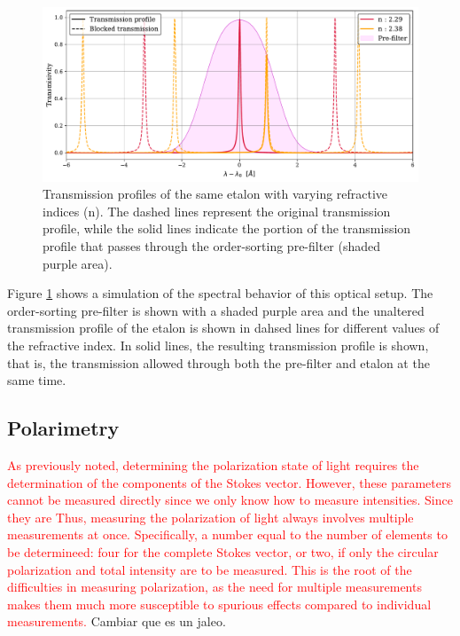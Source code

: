 \begin{figure}
  \centering
  \includegraphics[width = \textwidth]{figures/Introduction_to_spectropolarimeters/Etalon_and_prefilter_example.pdf}
  \caption{Transmission profiles of the same etalon with varying refractive indices (n). The dashed lines represent the original transmission profile, while the solid lines indicate the portion of the transmission profile that passes through the order-sorting pre-filter (shaded purple area).} 
  \label{fig_ch2: etalon_example}
\end{figure}

Figure \ref{fig_ch2: etalon_example} shows a simulation of the spectral behavior of this optical setup. The order-sorting pre-filter is shown with a shaded purple area and the unaltered transmission profile of the etalon is shown in dahsed lines for different values of the refractive index. In solid lines, the resulting transmission profile is shown, that is, the transmission allowed through both the pre-filter and etalon at the same time. 

\subsection{Polarimetry}

\textcolor{red}{As previously noted, determining the polarization state of light requires the determination of the components of the Stokes vector. However, these parameters cannot be measured directly since we only know how to measure intensities. Since they are  Thus, measuring the polarization of light always involves multiple measurements at once. Specifically, a number equal to the number of elements to be determineed: four for the complete Stokes vector, or two, if only the circular polarization and total intensity are to be measured. This is the root of the difficulties in measuring polarization, as the need for multiple measurements makes them much more susceptible to spurious effects compared to individual measurements.} Cambiar que es un jaleo. 

